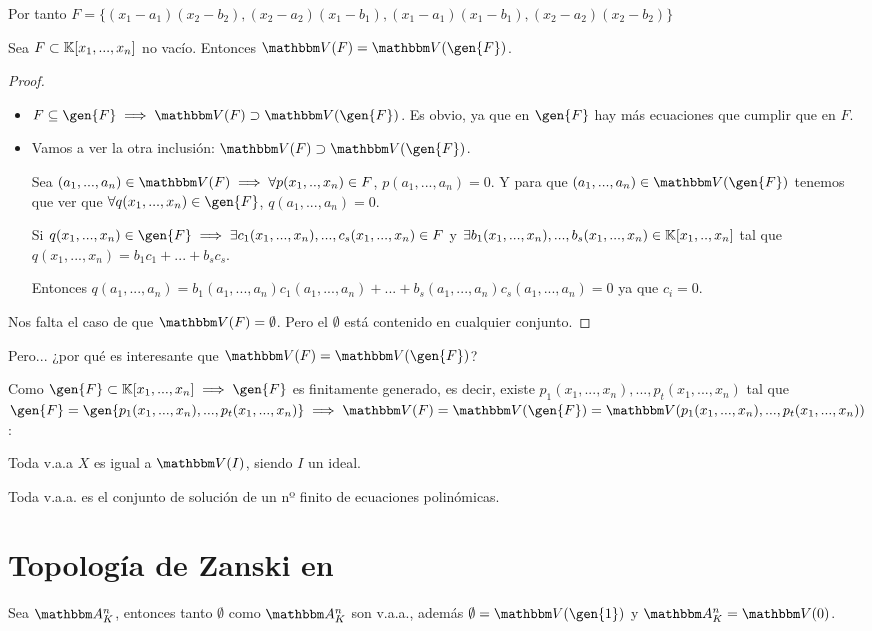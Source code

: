 \begin{example}
\begin{enumerate}
		Por tanto $F=\{ (x_1-a_1)(x_2-b_2), (x_2-a_2)(x_1-b_1), (x_1-a_1)(x_1-b_1), (x_2-a_2)(x_2-b_2)  \}$
	\end{enumerate}
\end{example}


\begin{prop}
	Sea $F \subset \mathbb{K}[x_1,...,x_n]$ no vacío. Entonces $\V(F)=\V(\gen{F})$.
\end{prop}

\begin{proof}
	\begin{itemize}
		\item $F \subseteq \gen{F} \implies \V(F) \supset \V(\gen{F})$. Es obvio, ya que en $\gen{F}$ hay más ecuaciones que cumplir que en $F$.
		\item Vamos a ver la otra inclusión: $\V(F) \supset \V(\gen{F})$.

		Sea $(a_1,...,a_n) \in \V(F) \implies \forall p(x_1,..,x_n) \in F$, $p(a_1,...,a_n)=0$. Y para que $(a_1,...,a_n) \in \V(\gen{F})$ tenemos que ver que $\forall q(x_1,...,x_n)\in \gen{F}$, $q(a_1,...,a_n)=0$.

		Si $q(x_1,...,x_n)\in \gen{F} \implies \exists c_1(x_1,...,x_n),...,c_s(x_1,...,x_n) \in F$ y $\exists b_1(x_1,...,x_n),...,b_s(x_1,...,x_n) \in \mathbb{K}[x_1,..,x_n]$ tal que $q(x_1,...,x_n)=b_1c_1+...+b_sc_s$.

		Entonces $q(a_1,...,a_n)=b_1(a_1,...,a_n)c_1(a_1,...,a_n)+...+b_s(a_1,...,a_n)c_s(a_1,...,a_n) = 0$  ya que $c_i=0$.
	\end{itemize}

	Nos falta el caso de que $\V(F)=\emptyset$. Pero el $\emptyset$ está contenido en cualquier conjunto.
\end{proof}

Pero... ¿por qué es interesante que $\V(F)=\V(\gen{F})$?

Como $\gen{F}\subset \K[x_1,...,x_n] \implies \gen{F}$ es finitamente generado, es decir, existe $p_1(x_1,...,x_n),...,p_t(x_1,...,x_n)$ tal que $\gen{F} = \gen{p_1(x_1,...,x_n),...,p_t(x_1,...,x_n)} \implies \V(F)=\V(\gen{F})=\V(p_1(x_1,...,x_n),...,p_t(x_1,...,x_n))$:

\obs Toda v.a.a $X$ es igual a $\V(I)$, siendo $I$ un ideal.

\obs Toda v.a.a. es el conjunto de solución de un nº finito de ecuaciones polinómicas.

\section{Topología de Zanski en \Akn}
Sea $\Akn$, entonces tanto $\emptyset$ como $\Akn$ son v.a.a., además $\emptyset=\V(\gen{1})$ y $\Akn=\V(0)$.


